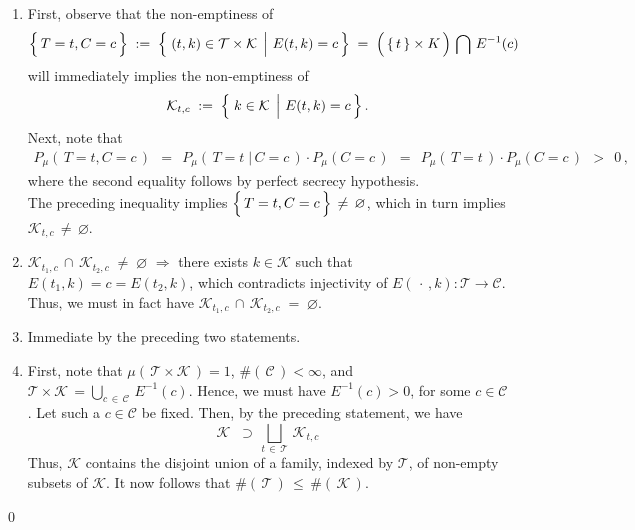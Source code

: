 \proof
\begin{enumerate}
\item
	First, observe that the non-emptiness of
	\begin{equation*}
	\left\{\,\overset{{\color{white}.}}{T}=t,C=c\,\right\}
	\; := \;
		\left\{\,\left. (t,k) \overset{{\color{white}.}}{\in} \mathcal{T}\times\mathcal{K} \;\,\right\vert\, E(t,k) = c\,\right\}
	\; = \;
		\left(\,\{\,t\,\} \overset{{\color{white}.}}{\times} K\,\right) \, \bigcap \, E^{-1}(c)
	\end{equation*}
	will immediately implies the non-emptiness of
	\begin{equation*}
	\mathcal{K}_{t,c} \; := \; \left\{\,\left. k \overset{{\color{white}.}}{\in} \mathcal{K} \;\,\right\vert\, E(t,k) = c\,\right\}.
	\end{equation*}
	Next, note that
	\begin{eqnarray*}
	P_{\mu}\!\left(\,T = t, C = c\,\right)
	\;\, = \;\,
		P_{\mu}\!\left(\,T = t \;\vert\, C = c\,\right) \cdot P_{\mu}\!\left(C=c\,\right)
	\;\, = \;\,
		P_{\mu}\!\left(\,T = t \,\right) \cdot P_{\mu}\!\left(C=c\,\right)
	\;\, > \;\,
		0\,,
	\end{eqnarray*}
	where the second equality follows by perfect secrecy hypothesis.\\
	The preceding inequality implies
	$\left\{\,\overset{{\color{white}.}}{T}=t,C=c\,\right\} \,\neq\, \varnothing$,
	which in turn implies $\mathcal{K}_{t,c} \,\neq\, \varnothing$.
\item
	$\mathcal{K}_{t_{1},c} \,\cap\, \mathcal{K}_{t_{2},c} \; \neq \; \varnothing$
	\;$\Longrightarrow$\;
	there exists $k \in \mathcal{K}$ such that $E(t_{1},k) = c = E(t_{2},k)$,
	which contradicts injectivity of
	$E(\,\cdot\,,k) : \mathcal{T} \longrightarrow \mathcal{C}$.
	Thus, we must in fact have
	$\mathcal{K}_{t_{1},c} \,\cap\, \mathcal{K}_{t_{2},c} \; = \; \varnothing$.
\item
	Immediate by the preceding two statements.
\item
	First, note that
	$\mu(\,\mathcal{T} \times \mathcal{K}\,) = 1$,
	$\#\!\left(\,\mathcal{C}\,\right) < \infty$, and
	$\mathcal{T} \times \mathcal{K} \, = \underset{c\,\in\,\mathcal{C}}{\bigcup}\,E^{-1}(c)$.
	Hence, we must have $E^{-1}(c) > 0$, for some $c \in \mathcal{C}$.
	Let such a $c \in \mathcal{C}$ be fixed.
	Then, by the preceding statement, we have
	\begin{equation*}
	\mathcal{K}
	\;\; \supset \,
		\underset{t\,\in\,\mathcal{T}}{\bigsqcup}\, \mathcal{K}_{t,c}
	\end{equation*}
	Thus, $\mathcal{K}$ contains the disjoint union of a family, indexed by $\mathcal{T}$,
	of non-empty subsets of $\mathcal{K}$.
	It now follows that $\#\!\left(\,\mathcal{T}\,\right) \,\leq\, \#\!\left(\,\mathcal{K}\,\right)$.
\end{enumerate}
\qed

